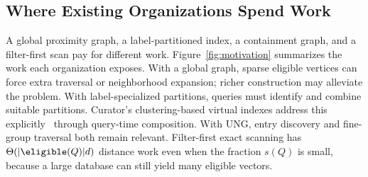 \subsection{Where Existing Organizations Spend Work}
A global proximity graph, a label-partitioned index, a containment graph, and
a filter-first scan pay for different work.  Figure~\ref{fig:motivation}
summarizes the work each organization exposes.
With a global graph, sparse eligible vertices can force extra traversal or
neighborhood expansion; richer construction may alleviate the problem.
With label-specialized partitions, queries must identify and combine suitable
partitions.  Curator's clustering-based virtual indexes address this
explicitly~\cite{jin2026curator} through query-time composition.  With UNG, entry discovery and
fine-group traversal both remain relevant.  Filter-first exact scanning has
$\Theta(|\eligible(Q)|d)$ distance work even when the fraction $s(Q)$ is
small, because a large database can still yield many eligible vectors.

